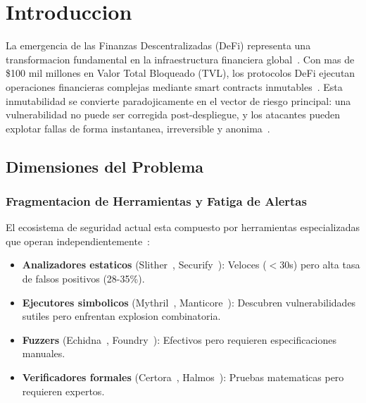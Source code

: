 \documentclass[11pt]{article}
\theoremstyle{definition}
\theoremstyle{plain}
\theoremstyle{remark}
\begin{document}
\section{Introduccion}
\label{sec:intro}

La emergencia de las Finanzas Descentralizadas (DeFi) representa una transformacion fundamental en la infraestructura financiera global~\cite{werner2022sok}. Con mas de \$100 mil millones en Valor Total Bloqueado (TVL), los protocolos DeFi ejecutan operaciones financieras complejas mediante smart contracts inmutables~\cite{gudgeon2020defi}. Esta inmutabilidad se convierte paradojicamente en el vector de riesgo principal: una vulnerabilidad no puede ser corregida post-despliegue, y los atacantes pueden explotar fallas de forma instantanea, irreversible y anonima~\cite{perez2021smart}.

\subsection{Dimensiones del Problema}

\subsubsection{Fragmentacion de Herramientas y Fatiga de Alertas}

El ecosistema de seguridad actual esta compuesto por herramientas especializadas que operan independientemente~\cite{durieux2020empirical}:

\begin{itemize}[leftmargin=*]
    \item \textbf{Analizadores estaticos} (Slither~\cite{feist2019slither}, Securify~\cite{tsankov2018securify}): Veloces ($<$30s) pero alta tasa de falsos positivos (28-35\%).
    
    \item \textbf{Ejecutores simbolicos} (Mythril~\cite{mueller2018mythril}, Manticore~\cite{mossberg2019manticore}): Descubren vulnerabilidades sutiles pero enfrentan explosion combinatoria.
    
    \item \textbf{Fuzzers} (Echidna~\cite{grieco2020echidna}, Foundry~\cite{foundry2023}): Efectivos pero requieren especificaciones manuales.
    
    \item \textbf{Verificadores formales} (Certora~\cite{certora2023}, Halmos~\cite{halmos2023}): Pruebas matematicas pero requieren expertos.
\end{itemize}
\end{document}
